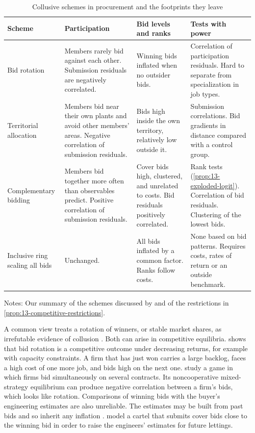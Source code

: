 \begin{table}[htbp]
\centering
\caption{Collusive schemes in procurement and the footprints they leave}\label{tab:13-footprints}
\footnotesize
\begin{tabularx}{\textwidth}{@{}>{\raggedright\arraybackslash}p{2.2cm}>{\raggedright\arraybackslash}X>{\raggedright\arraybackslash}X>{\raggedright\arraybackslash}X@{}}
\toprule
Scheme & Participation & Bid levels and ranks & Tests with power\\
\midrule
Bid rotation & Members rarely bid against each other. Submission residuals are negatively correlated. & Winning
bids inflated when no outsider bids. & Correlation of participation residuals. Hard to separate from
specialization in job types.\\
\addlinespace
Territorial allocation & Members bid near their own plants and avoid other members' areas. Negative correlation
of submission residuals. & Bids high inside the own territory, relatively low outside it. & Submission
correlations. Bid gradients in distance compared with a control group.\\
\addlinespace
Complementary bidding & Members bid together more often than observables predict. Positive correlation of
submission residuals. & Cover bids high, clustered, and unrelated to costs. Bid residuals positively correlated. &
Rank tests (\cref{prop:13-exploded-logit}). Correlation of bid residuals. Clustering of the lowest bids.\\
\addlinespace
Inclusive ring scaling all bids & Unchanged. & All bids inflated by a common factor. Ranks follow costs. & None
based on bid patterns. Requires costs, rates of return or an outside benchmark.\\
\bottomrule
\end{tabularx}

\smallskip
\begin{minipage}{0.95\textwidth}\footnotesize
Notes: Our summary of the schemes discussed by \citet{PorterZona1993,PorterZona1999} and of the restrictions in
\cref{prop:13-competitive-restrictions}.
\end{minipage}
\end{table}

A common view treats a rotation of winners, or stable market shares, as irrefutable evidence of collusion
\citep[p.~1]{PorterZona1993}. Both can arise in competitive equilibria. \citet{Zona1986} shows that bid rotation is a competitive outcome under
decreasing returns, for example with capacity constraints. A firm that has just won carries a large backlog, faces
a high cost of one more job, and bids high on the next one. \citet{LangRosenthal1991} study a game in which firms bid
simultaneously on several contracts. Its noncooperative mixed-strategy equilibrium can produce negative correlation
between a firm's bids, which looks like rotation. Comparisons of winning bids with the buyer's
engineering estimates are also unreliable. The estimates may be built from past bids and so inherit any inflation
\citep[p.~2]{PorterZona1993}. \citet{FeinsteinBlockNold1985} model a cartel that submits cover bids close to the
winning bid in order to raise the engineers' estimates for future lettings.

